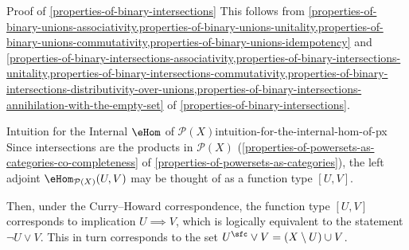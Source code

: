 \begin{Proof}{Proof of \cref{properties-of-binary-intersections}}
    This follows from \cref{properties-of-binary-unions-associativity,properties-of-binary-unions-unitality,properties-of-binary-unions-commutativity,properties-of-binary-unions-idempotency} and \cref{properties-of-binary-intersections-associativity,properties-of-binary-intersections-unitality,properties-of-binary-intersections-commutativity,properties-of-binary-intersections-distributivity-over-unions,properties-of-binary-intersections-annihilation-with-the-empty-set} of \cref{properties-of-binary-intersections}.
\end{Proof}
\begin{remark}{Intuition for the Internal $\eHom$ of $\mathcal{P}(X)$}{intuition-for-the-internal-hom-of-px}%
    Since intersections are the products in $\mathcal{P}(X)$ (\cref{properties-of-powersets-as-categories-co-completeness} of \cref{properties-of-powersets-as-categories}), the left adjoint $\eHom_{\mathcal{P}(X)}(U,V)$ may be thought of as a function type $[U,V]$.

    Then, under the Curry--Howard correspondence, the function type $[U,V]$ corresponds to implication $U\implies V$, which is logically equivalent to the statement $\neg U\vee V$. This in turn corresponds to the set $U^{\sfc}\vee V=(X\setminus U)\cup V$.
\end{remark}

